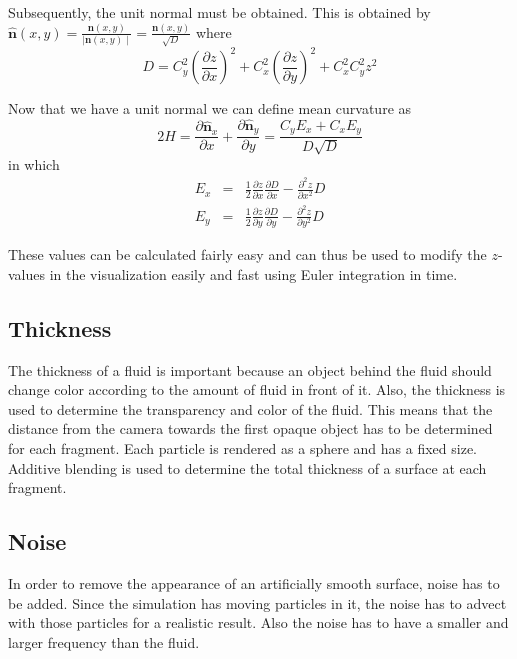 Subsequently, the unit normal must be obtained. This is obtained by \(\hat{\mathbf{n}}(x,y) = \frac{\mathbf{n}(x,y)}{\mid \mathbf{n}(x,y)\mid} = \frac{\mathbf{n}(x,y)}{\sqrt{D}}\) where 
\begin{equation}
	\label{eq:D}
	D = C_y^2 \left(\frac{\partial z}{\partial x}\right)^2 + C_x^2 \left(\frac{\partial z}{\partial y}\right)^2 + C_x^2 C_y^2 z^2
\end{equation}

Now that we have a unit normal we can define mean curvature as 
\begin{equation}
	\label{eq:curvy}
	2H = \frac{\partial \hat{\mathbf{n}}_x}{\partial x} + \frac{\partial\hat{\mathbf{n}}_y}{\partial y} = \frac{C_y E_x + C_x E_y}{D\sqrt{D}}
\end{equation}
in which
\begin{eqnarray}
	E_x &=& \frac{1}{2}\frac{\partial z}{\partial x}\frac{\partial D}{\partial x} - \frac{\partial^2z}{\partial x^2}D\\
	E_y &=& \frac{1}{2}\frac{\partial z}{\partial y}\frac{\partial D}{\partial y} - \frac{\partial^2z}{\partial y^2}D
\end{eqnarray}

These values can be calculated fairly easy and can thus be used to modify the \(z\)-values in the visualization easily and fast using Euler integration in time.

\subsection{Thickness}
The thickness of a fluid is important because an object behind the fluid should change color according to the amount of fluid in front of it.
Also, the thickness is used to determine the transparency and color of the fluid.
This means that the distance from the camera towards the first opaque object has to be determined for each fragment.
Each particle is rendered as a sphere and has a fixed size.
Additive blending is used to determine the total thickness of a surface at each fragment.

\subsection{Noise}
In order to remove the appearance of an artificially smooth surface, noise has to be added.
Since the simulation has moving particles in it, the noise has to advect with those particles for a realistic result.
Also the noise has to have a smaller and larger frequency than the fluid.

